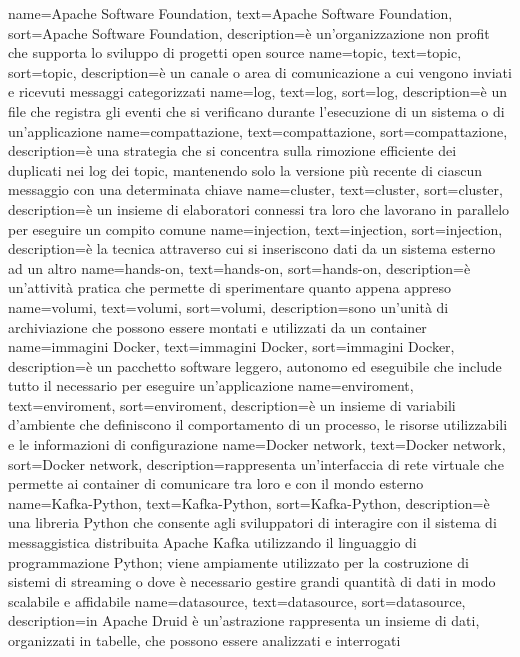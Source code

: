 {
    name={Apache Software Foundation},
    text=Apache Software Foundation,
    sort=Apache Software Foundation,
    description={è un'organizzazione non profit che supporta lo sviluppo di progetti open source}
}
{
    name={topic},
    text=topic,
    sort=topic,
    description={è un canale o area di comunicazione a cui vengono inviati e ricevuti messaggi categorizzati}
}
{
    name={log},
    text=log,
    sort=log,
    description={è un file che registra gli eventi che si verificano durante l'esecuzione di un sistema o di un'applicazione}
}
{
    name={compattazione},
    text=compattazione,
    sort=compattazione,
    description={è una strategia che si concentra sulla rimozione efficiente dei duplicati nei log dei topic, mantenendo solo la versione più recente di ciascun messaggio con una determinata chiave}
}
{
    name={cluster},
    text=cluster,
    sort=cluster,
    description={è un insieme di elaboratori connessi tra loro che lavorano in parallelo per eseguire un compito comune}
}
{
    name={injection},
    text=injection,
    sort=injection,
    description={è la tecnica attraverso cui si inseriscono dati da un sistema esterno ad un altro}
}
{
    name={hands-on},
    text=hands-on,
    sort=hands-on,
    description={è un'attività pratica che permette di sperimentare quanto appena appreso}
}
{
    name={volumi},
    text=volumi,
    sort=volumi,
    description={sono un'unità di archiviazione che possono essere montati e utilizzati da un container}
}
{
    name={immagini Docker},
    text=immagini Docker,
    sort=immagini Docker,
    description={è un pacchetto software leggero, autonomo ed eseguibile che include tutto il necessario per eseguire un'applicazione}
}
{
    name={enviroment},
    text=enviroment,
    sort=enviroment,
    description={è un insieme di variabili d'ambiente che definiscono il comportamento di un processo, le risorse utilizzabili e le informazioni di configurazione}
}
{
    name={Docker network},
    text=Docker network,
    sort=Docker network,
    description={rappresenta un'interfaccia di rete virtuale che permette ai container di comunicare tra loro e con il mondo esterno}
}
{
    name={Kafka-Python},
    text=Kafka-Python,
    sort=Kafka-Python,
    description={è una libreria Python che consente agli sviluppatori di interagire con il sistema di messaggistica distribuita Apache Kafka utilizzando il linguaggio di programmazione Python; viene ampiamente utilizzato per la costruzione di sistemi di streaming o dove è necessario gestire grandi quantità di dati in modo scalabile e affidabile}
}
{
    name={datasource},
    text=datasource,
    sort=datasource,
    description={in Apache Druid è un'astrazione rappresenta un insieme di dati, organizzati in tabelle, che possono essere analizzati e interrogati}
}

